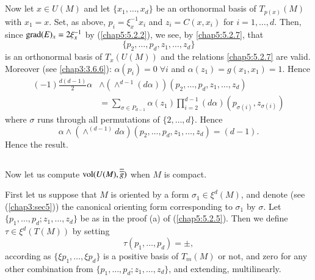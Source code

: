 \setcounter{subsection}{8}
\subsection{}\label{chap5:5.2.9}
Now let $x\in U(M)$ and let $\{x_{1},\ldots,x_{d}\}$ be an orthonormal
basis of $T_{p(x)}(M)$ with $x_{1}=x$. Set, as above,
$p_{i}=\xi^{-1}_{x}x_{i}$ and $z_{i}=C(x,x_{i})$ for
$i=1,\ldots,d$. Then, since $\operatorname{grad}(E)_{x}=2\xi^{-1}_{x}$ by
(\ref{chap5:5.2.2}), we see, by \eqref{chap5:5.2.7}, that
$$
\{p_{2},\ldots,p_{d}, z_{1},\ldots,z_{d}\}
$$
is \pageoriginale an orthonormal basis of $T_{x}(U(M))$ and the
relations \eqref{chap5:5.2.7} are valid. Moreover (see \ref{chap3:3.6.6}):
$\alpha(p_{i})=0 \; \forall i$ and $\alpha(z_{1})=g(x_{1},x_{1})=1$. Hence
\begin{align*}
(-1)\frac{d(d-1)}{2}\alpha&\wedge
(\mathop{\wedge}^{d-1}(d\alpha))(p_{2},\ldots,p_{d},z_{1},\ldots,z_{d})\\
&=\sum_{\sigma\in P_{d-1}}\alpha(z_{1})\prod^{d-1}_{i=2}
(d\alpha)(p_{\sigma(i)},z_{\sigma(i)})
\end{align*}
where $\sigma$ runs through all permutations of
$\{2,\ldots,d\}$. Hence
$$
\alpha\wedge(\mathop{\wedge}^{(d-1)}d\alpha)(p_{2},\ldots,p_{d},z_{1},\ldots,z_{d})=(d-1). 
$$
Hence the result.

\subsection{}\label{chap5:5.2.10}
Now let us compute $\operatorname{vol}(U(M),\overline{\overline{g}})$ when $M$ is
compact.

First let us suppose that $M$ is oriented by a form $\sigma_{1}\in
\xi^{d}(M)$, and denote (see (\ref{chap3:sec5})) the canonical orienting form
corresponding to $\sigma_{1}$ by $\sigma$. Let
$\{p_{1},\ldots,p_{d};z_{1},\ldots,z_{d}\}$ be as in the proof (a) of 
(\ref{chap5:5.2.5}). Then we define $\tau\in\xi^{d}(T(M))$ by setting
$$
\tau(p_{1},\ldots,p_{d})=\pm,
$$
according as $\{\xi p_{1},\ldots,\xi p_{d}\}$ is a positive basis of
$T_{m}(M)$ or not, and zero for any other combination from
$\{p_{1},\ldots,p_{d};z_{1},\ldots,z_{d}\}$, and extending,
multilinearly.

